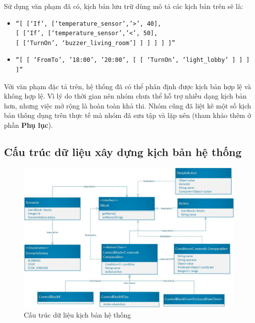 \documentclass[12pt,a4paper,oneside]{extbook}
\begin{document}
\noindent
Sử dụng văn phạm đã có, kịch bản lưu trữ dùng mô tả các kịch bản trên sẽ là:

\begin{itemize}[topsep=1mm,itemsep=-0.5mm]
\item \begin{verbatim}
“[ [‘If’, [‘temperature_sensor’,’>’, 40], 
[ [‘If’, [‘temperature_sensor’,’<’, 50], 
[ [‘TurnOn’, ‘buzzer_living_room’] ] ] ] ] ]”
\end{verbatim}
\item \begin{verbatim}
“[ [ ‘FromTo’, ’18:00’, ’20:00’, [ [ ‘TurnOn’, ‘light_lobby’ ] ] ] ]”
\end{verbatim}
\vspace{1mm}
\end{itemize}

\noindent
Với văn phạm đặc tả trên, hệ thống đã có thể phân định được kịch bản hợp lệ và không hợp lệ. Vì lý do thời gian nên nhóm chưa thể hỗ trợ nhiều dạng kịch bản hơn, nhưng việc mở rộng là hoàn toàn khả thi. Nhóm cũng đã liệt kê một số kịch bản thông dụng trên thực tế mà nhóm đã sưu tập và lặp nên (tham khảo thêm ở phần \textbf{Phụ lục}).

\subsection{Cấu trúc dữ liệu xây dựng kịch bản hệ thống}\label{grammar-data-structure}

\begin{figure}[h]
  \centering
    \includegraphics[width=15cm]{6-data-structure-scenario}
  \caption{Cấu trúc dữ liệu kịch bản hệ thống}\label{fig:6-data-structure-scenario}
\end{figure}
\end{document}
